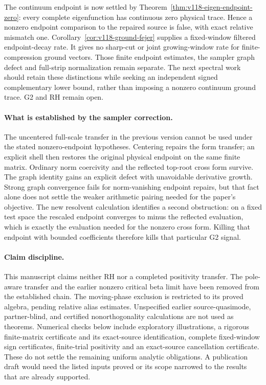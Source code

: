 \documentclass[11pt]{article}
\theoremstyle{remark}
\begin{document}
The continuum endpoint is now settled by
Theorem~\ref{thm:v118-eigen-endpoint-zero}: every complete eigenfunction
has continuous zero physical trace. Hence a nonzero endpoint comparison
to the repaired source is false, with exact relative mismatch one.
Corollary~\ref{cor:v118-ground-fejer} supplies a fixed-window filtered
endpoint-decay rate. It gives no sharp-cut or joint growing-window rate
for finite-compression ground vectors. Those finite endpoint estimates,
the sampler graph defect and full-strip normalization remain separate.
The next spectral work should retain these distinctions while seeking
an independent signed complementary lower bound, rather than imposing
a nonzero continuum ground trace. G2 and RH remain open.


\paragraph{What is established by the sampler correction.}
The uncentered full-scale transfer in the previous version cannot be used
under the stated nonzero-endpoint hypotheses. Centering repairs the form
transfer; an explicit shell then restores the original physical endpoint
on the same finite matrix. Ordinary norm coercivity and the reflected
top-root cross form survive. The graph identity gains an explicit defect
with unavoidable derivative growth. Strong graph convergence fails for
norm-vanishing endpoint repairs, but that fact alone does not settle the
weaker arithmetic pairing needed for the paper's objective. The new
resolvent calculation identifies a second obstruction: on a fixed test
space the rescaled endpoint converges to minus the reflected evaluation,
which is exactly the evaluation needed for the nonzero cross form.
Killing that endpoint with bounded coefficients therefore kills that
particular G2 signal.

\paragraph{Claim discipline.}
This manuscript claims neither RH nor a completed positivity transfer.
The pole-aware transfer and the earlier nonzero critical beta limit have
been removed from the established chain. The moving-phase exclusion is
restricted to its proved algebra, pending relative alias estimates.
Unspecified earlier source-quasimode, partner-blind, and certified
nonorthogonality calculations are not used as theorems. Numerical checks
below include exploratory illustrations, a rigorous finite-matrix
certificate and its exact-source identification, complete fixed-window
sign certificates, finite-trial positivity and an exact-source
cancellation certificate. These do not settle the remaining uniform
analytic obligations. A publication draft would need the listed inputs
proved or its scope narrowed to the results that are already supported.
\end{document}

